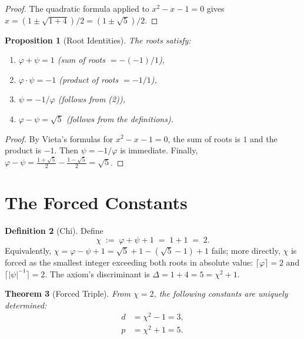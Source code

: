 \documentclass[11pt,a4paper]{article}
\theoremstyle{plain}
\newtheorem{theorem}{Theorem}[section]
\newtheorem{proposition}[theorem]{Proposition}
\theoremstyle{definition}
\newtheorem{definition}[theorem]{Definition}
\begin{document}
\begin{proof}
The quadratic formula applied to $x^2 - x - 1 = 0$ gives
$x = (1 \pm \sqrt{1+4})/2 = (1 \pm \sqrt{5})/2$.
\end{proof}

\begin{proposition}[Root Identities]\label{prop:root-identities}
The roots satisfy:
\begin{enumerate}[nosep]
  \item $\varphi + \psi = 1$ \quad(sum of roots $= -(-1)/1$),
  \item $\varphi \cdot \psi = -1$ \quad(product of roots $= -1/1$),
  \item $\psi = -1/\varphi$ \quad(follows from (2)),
  \item $\varphi - \psi = \sqrt{5}$ \quad(follows from the definitions).
\end{enumerate}
\end{proposition}

\begin{proof}
By Vieta's formulas for $x^2 - x - 1 = 0$, the sum of roots is $1$ and
the product is $-1$. Then $\psi = -1/\varphi$ is immediate. Finally,
$\varphi - \psi = \frac{1+\sqrt{5}}{2} - \frac{1-\sqrt{5}}{2} = \sqrt{5}$.
\end{proof}

\section{The Forced Constants}\label{sec:constants}

\begin{definition}[Chi]\label{def:chi}
Define
\begin{equation}\label{eq:chi}
  \chi \;:=\; \varphi + \psi + 1 \;=\; 1 + 1 \;=\; 2.
\end{equation}
Equivalently, $\chi = \varphi - \psi + 1 = \sqrt{5} + 1 - (\sqrt{5} - 1) + 1$
fails; more directly, $\chi$ is forced as the smallest integer exceeding
both roots in absolute value:
$\lceil \varphi \rceil = 2$ and $\lceil |\psi|^{-1} \rceil = 2$.
The axiom's discriminant is $\Delta = 1 + 4 = 5 = \chi^2 + 1$.
\end{definition}

\begin{theorem}[Forced Triple]\label{thm:forced-triple}
From $\chi = 2$, the following constants are uniquely determined:
\begin{align}
  d &= \chi^2 - 1 = 3, \label{eq:d} \\
  p &= \chi^2 + 1 = 5. \label{eq:p}
\end{align}
\end{theorem}
\end{document}
